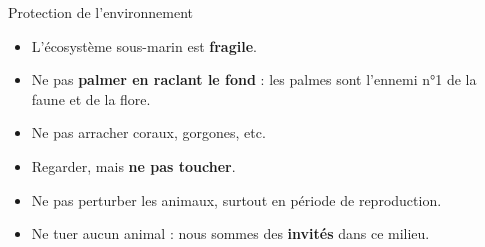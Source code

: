 \begin{frame}{Protection de l’environnement}
  \begin{itemize}
    \item L’écosystème sous-marin est \textbf{fragile}.
    \item Ne pas \textbf{palmer en raclant le fond} : les palmes sont l’ennemi n°1 de la faune et de la flore.
    \item Ne pas arracher coraux, gorgones, etc.
    \item Regarder, mais \textbf{ne pas toucher}.
    \item Ne pas perturber les animaux, surtout en période de reproduction.
    \item Ne tuer aucun animal : nous sommes des \textbf{invités} dans ce milieu.
  \end{itemize}
\end{frame}
